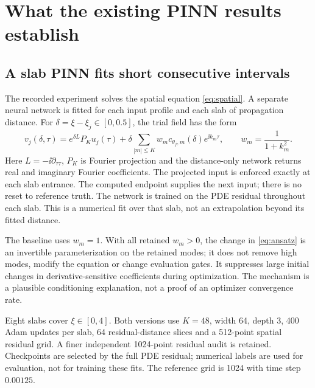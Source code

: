 \section{What the existing PINN results establish}\label{sec:pinn}
\subsection{A slab PINN fits short consecutive intervals}
The recorded experiment solves the spatial equation \eqref{eq:spatial}. A separate neural network is fitted for each input profile and each slab of propagation distance. For $\delta=\xi-\xi_j\in[0,0.5]$, the trial field has the form
\begin{equation}
 v_j(\delta,\tau)=e^{\delta L}P_Ku_j(\tau)
  +\delta\sum_{|m|\le K}w_m c_{\theta_j,m}(\delta)e^{\ii k_m\tau},
 \qquad w_m=\frac1{1+k_m^2}.\label{eq:ansatz}
\end{equation}
Here $L=-\ii\partial_{\tau\tau}$, $P_K$ is Fourier projection and the distance-only network returns real and imaginary Fourier coefficients. The projected input is enforced exactly at each slab entrance. The computed endpoint supplies the next input; there is no reset to reference truth. The network is trained on the PDE residual throughout each slab. This is a numerical fit over that slab, not an extrapolation beyond its fitted distance.

The baseline uses $w_m=1$. With all retained $w_m>0$, the change in \eqref{eq:ansatz} is an invertible parameterization on the retained modes; it does not remove high modes, modify the equation or change evaluation gates. It suppresses large initial changes in derivative-sensitive coefficients during optimization. The mechanism is a plausible conditioning explanation, not a proof of an optimizer convergence rate.

Eight slabs cover $\xi\in[0,4]$. Both versions use $K=48$, width 64, depth 3, 400 Adam updates per slab, 64 residual-distance slices and a 512-point spatial residual grid. A finer independent 1024-point residual audit is retained. Checkpoints are selected by the full PDE residual; numerical labels are used for evaluation, not for training these fits. The reference grid is 1024 with time step $0.00125$.
\clearpage
